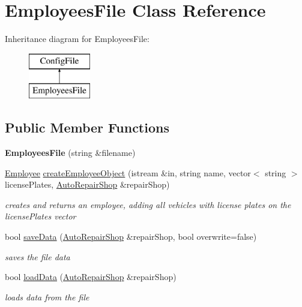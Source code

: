 \hypertarget{class_employees_file}{}\section{Employees\+File Class Reference}
\label{class_employees_file}
Inheritance diagram for Employees\+File\+:\begin{figure}[H]
\begin{center}
\leavevmode
\includegraphics[height=2.000000cm]{class_employees_file}
\end{center}
\end{figure}
\subsection*{Public Member Functions}
\begin{DoxyCompactItemize}
\item 
\hypertarget{class_employees_file_a8f029a7de1acc27856a379813c4c03e0}{}{\bfseries Employees\+File} (string \&filename)\label{class_employees_file_a8f029a7de1acc27856a379813c4c03e0}

\item 
\hypertarget{class_employees_file_a4e36311279ed0aab10435eaac5126151}{}\hyperlink{class_employee}{Employee} \hyperlink{class_employees_file_a4e36311279ed0aab10435eaac5126151}{create\+Employee\+Object} (istream \&in, string name, vector$<$ string $>$ license\+Plates, \hyperlink{class_auto_repair_shop}{Auto\+Repair\+Shop} \&repair\+Shop)\label{class_employees_file_a4e36311279ed0aab10435eaac5126151}

\begin{DoxyCompactList}\small\item\em creates and returns an employee, adding all vehicles with license plates on the license\+Plates vector \end{DoxyCompactList}\item 
\hypertarget{class_employees_file_aa9b65666486f2657808953bf2d9492f4}{}bool \hyperlink{class_employees_file_aa9b65666486f2657808953bf2d9492f4}{save\+Data} (\hyperlink{class_auto_repair_shop}{Auto\+Repair\+Shop} \&repair\+Shop, bool overwrite=false)\label{class_employees_file_aa9b65666486f2657808953bf2d9492f4}

\begin{DoxyCompactList}\small\item\em saves the file data \end{DoxyCompactList}\item 
bool \hyperlink{class_employees_file_a016b7476237e69b8f08925e85a0cba30}{load\+Data} (\hyperlink{class_auto_repair_shop}{Auto\+Repair\+Shop} \&repair\+Shop)
\begin{DoxyCompactList}\small\item\em loads data from the file \end{DoxyCompactList}\end{DoxyCompactItemize}
